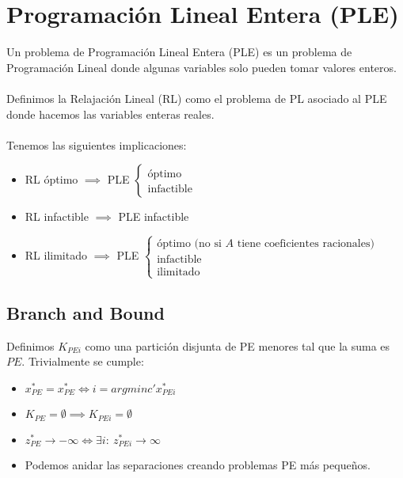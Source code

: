 \documentclass[leqno]{article}
\begin{document}
\section{Programación Lineal Entera (PLE)}
Un problema de Programación Lineal Entera (PLE) es un problema de Programación Lineal donde algunas variables solo pueden tomar valores enteros. \\
\\
Definimos la Relajación Lineal (RL) como el problema de PL asociado al PLE donde hacemos las variables enteras reales.\\
\\
Tenemos las siguientes implicaciones:
\begin{itemize}
  \item RL óptimo $\implies$ PLE $\begin{cases}
   \text{óptimo} \\
   \text{infactible}   
  \end{cases}$
\item RL infactible $\implies$ PLE infactible
\item RL ilimitado $\implies$ PLE $\begin{cases}
  \text{óptimo (no si } A \text{ tiene coeficientes racionales)} \\
  \text{infactible} \\
  \text{ilimitado}
\end{cases}$
\end{itemize}
\subsection{Branch and Bound}
Definimos $K_{PEi}$ como una partición disjunta de PE menores tal que la suma es $PE$. Trivialmente se cumple:
\begin{itemize}
  \item $x^*_{PE} = x^*_{PE} \iff i = argmin{c'x^*_{PEi}}$ 
  \item $K_{PE} = \emptyset \implies K_{PEi} = \emptyset$
  \item $z_{PE}^*\to -\infty \iff \exists i: \ z_{PEi}^*\to \infty$
  \item Podemos anidar las separaciones creando problemas PE más pequeños.
\end{itemize}
\end{document}
